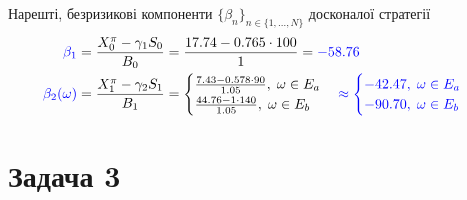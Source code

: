 \documentclass{test_template}
\begin{document}
Нарешті, безризикові компоненти $\{\beta_n\}_{n \in \{1,\dots,N\}}$ досконалої стратегії
\begin{align*}
    \textcolor{blue}{\beta_1} &= \frac{X_0^{\pi} - \gamma_1S_0}{B_0} = \frac{17.74 - 0.765 \cdot 100}{1} = \textcolor{blue}{-58.76} \\
    \textcolor{blue}{\beta_2(\omega)} &= \frac{X_1^{\pi} - \gamma_2S_1}{B_1} = \begin{cases}
        \frac{7.43 - 0.578 \cdot 90}{1.05}, \; \omega \in E_a \\
        \frac{44.76 - 1 \cdot 140}{1.05}, \; \omega \in E_b
    \end{cases} \textcolor{blue}{\approx \begin{cases}
        -42.47, \; \omega \in E_a \\
        -90.70, \; \omega \in E_b
    \end{cases}}
\end{align*}

\newpage

\section{Задача 3}
\end{document}
